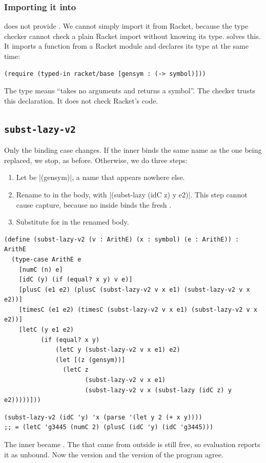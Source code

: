 \subsubsection{Importing it into }  does not provide . We cannot simply import it from Racket, because the type checker cannot check a plain Racket import without knowing its type.  solves this. It imports a function from a Racket module and declares its type at the same time:
\begin{lstlisting}
(require (typed-in racket/base [gensym : (-> symbol)]))
\end{lstlisting}
The type  means ``takes no arguments and returns a symbol''. The checker trusts this declaration. It does not check Racket's code.

\subsection{\texttt{subst-lazy-v2}}

Only the binding case changes. If the inner  binds the same name as the one being replaced, we stop, as before. Otherwise, we do three steps:
\begin{enumerate}
  \item Let  be \rkt|(gensym)|, a name that appears nowhere else.
  \item Rename  to  in the body, with \rkt|(subst-lazy (idC z) y e2)|. This step cannot cause capture, because no  inside  binds the fresh .
  \item Substitute  for  in the renamed body.
\end{enumerate}
\begin{lstlisting}
(define (subst-lazy-v2 (v : ArithE) (x : symbol) (e : ArithE)) : ArithE
  (type-case ArithE e
    [numC (n) e]
    [idC (y) (if (equal? x y) v e)]
    [plusC (e1 e2) (plusC (subst-lazy-v2 v x e1) (subst-lazy-v2 v x e2))]
    [timesC (e1 e2) (timesC (subst-lazy-v2 v x e1) (subst-lazy-v2 v x e2))]
    [letC (y e1 e2)
          (if (equal? x y)
              (letC y (subst-lazy-v2 v x e1) e2)
              (let [(z (gensym))]
                (letC z
                      (subst-lazy-v2 v x e1)
                      (subst-lazy-v2 v x (subst-lazy (idC z) y e2)))))]))
\end{lstlisting}
\begin{lstlisting}
(subst-lazy-v2 (idC 'y) 'x (parse '(let y 2 (+ x y))))
;; = (letC 'g3445 (numC 2) (plusC (idC 'y) (idC 'g3445)))
\end{lstlisting}
The inner  became . The  that came from outside is still free, so evaluation reports it as unbound. Now the  version and the  version of the program agree.

